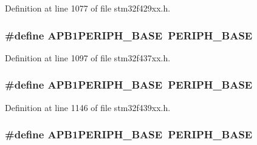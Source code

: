 Definition at line 1077 of file stm32f429xx.\+h.

\subsubsection[{\texorpdfstring{A\+P\+B1\+P\+E\+R\+I\+P\+H\+\_\+\+B\+A\+SE}{APB1PERIPH_BASE}}]{\setlength{\rightskip}{0pt plus 5cm}\#define A\+P\+B1\+P\+E\+R\+I\+P\+H\+\_\+\+B\+A\+SE~{\bf P\+E\+R\+I\+P\+H\+\_\+\+B\+A\+SE}}\hypertarget{group___peripheral__memory__map_ga45666d911f39addd4c8c0a0ac3388cfb}{}\label{group___peripheral__memory__map_ga45666d911f39addd4c8c0a0ac3388cfb}


Definition at line 1097 of file stm32f437xx.\+h.

\subsubsection[{\texorpdfstring{A\+P\+B1\+P\+E\+R\+I\+P\+H\+\_\+\+B\+A\+SE}{APB1PERIPH_BASE}}]{\setlength{\rightskip}{0pt plus 5cm}\#define A\+P\+B1\+P\+E\+R\+I\+P\+H\+\_\+\+B\+A\+SE~{\bf P\+E\+R\+I\+P\+H\+\_\+\+B\+A\+SE}}\hypertarget{group___peripheral__memory__map_ga45666d911f39addd4c8c0a0ac3388cfb}{}\label{group___peripheral__memory__map_ga45666d911f39addd4c8c0a0ac3388cfb}


Definition at line 1146 of file stm32f439xx.\+h.

\subsubsection[{\texorpdfstring{A\+P\+B1\+P\+E\+R\+I\+P\+H\+\_\+\+B\+A\+SE}{APB1PERIPH_BASE}}]{\setlength{\rightskip}{0pt plus 5cm}\#define A\+P\+B1\+P\+E\+R\+I\+P\+H\+\_\+\+B\+A\+SE~{\bf P\+E\+R\+I\+P\+H\+\_\+\+B\+A\+SE}}\hypertarget{group___peripheral__memory__map_ga45666d911f39addd4c8c0a0ac3388cfb}{}\label{group___peripheral__memory__map_ga45666d911f39addd4c8c0a0ac3388cfb}


